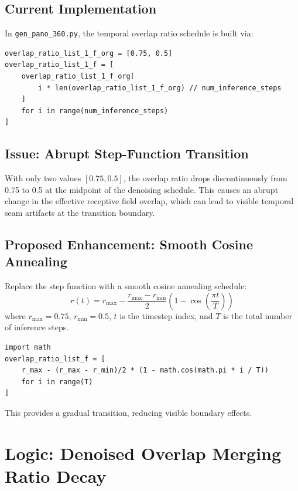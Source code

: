 \documentclass[11pt,a4paper]{article}
\newcommand{\file}[1]{\texttt{#1}}
\begin{document}
\subsection{Current Implementation}

In \file{gen\_pano\_360.py}, the temporal overlap ratio schedule is built via:
\begin{lstlisting}
overlap_ratio_list_1_f_org = [0.75, 0.5]
overlap_ratio_list_1_f = [
    overlap_ratio_list_1_f_org[
        i * len(overlap_ratio_list_1_f_org) // num_inference_steps
    ]
    for i in range(num_inference_steps)
]
\end{lstlisting}

\subsection{Issue: Abrupt Step-Function Transition}

With only two values $[0.75, 0.5]$, the overlap ratio drops discontinuously from 0.75 to 0.5 at the midpoint of the denoising schedule.
This causes an abrupt change in the effective receptive field overlap, which can lead to visible temporal seam artifacts at the transition boundary.

\subsection{Proposed Enhancement: Smooth Cosine Annealing}

Replace the step function with a smooth cosine annealing schedule:
\begin{equation}
    r(t) = r_{\max} - \frac{r_{\max} - r_{\min}}{2} \left(1 - \cos\left(\frac{\pi t}{T}\right)\right)
\end{equation}
where $r_{\max}=0.75$, $r_{\min}=0.5$, $t$ is the timestep index, and $T$ is the total number of inference steps.

\begin{lstlisting}
import math
overlap_ratio_list_f = [
    r_max - (r_max - r_min)/2 * (1 - math.cos(math.pi * i / T))
    for i in range(T)
]
\end{lstlisting}

This provides a gradual transition, reducing visible boundary effects.

\section{Logic: Denoised Overlap Merging Ratio Decay}
\end{document}

